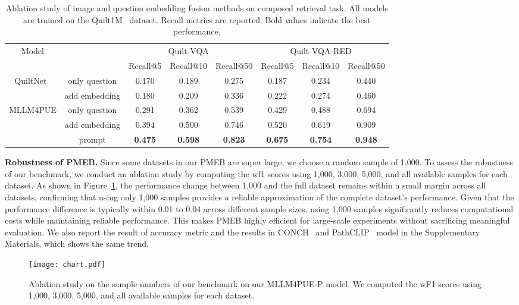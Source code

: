 \begin{table*}[h!]
\small
\centering
\begin{tabular}{cccccccc}
\hline
\multirow{2}{*}{Model}& & \multicolumn{3}{c}{Quilt-VQA~\cite{gamper2021multiple}} & \multicolumn{3}{c}{Quilt-VQA-RED~\cite{gamper2021multiple}} \\ 
&& Recall@5 &Recall@10 & Recall@50 & Recall@5 & Recall@10 & Recall@50\\
\hline
\multirow{2}{*}{QuiltNet~\cite{ikezogwo2024quilt}}& only question & 0.170 & 0.189 & 0.275 & 0.187 & 0.234 & 0.440\\ 
& add embedding & 0.180 & 0.209 & 0.336 & 0.222 & 0.274 & 0.460\\ 
\hline
\multirow{3}{*}{MLLM4PUE}&only question & 0.291 & 0.362 & 0.539 & 0.429 & 0.488 & 0.694\\ 
& add embedding& 0.394 & 0.500 & 0.746 & 0.520 & 0.619 & 0.909\\ 
&prompt & \textbf{0.475} & \textbf{0.598} & \textbf{0.823} & \textbf{0.675} & \textbf{0.754} & \textbf{0.948}\\
\hline
\end{tabular}
\caption{Ablation study of image and question embedding fusion methods on composed retrieval task. All models are trained on the Quilt1M~\cite{ikezogwo2024quilt} dataset. Recall metrics are reported. Bold values indicate the best performance.}
\label{t6}
\vspace{-2ex}
\end{table*}
\textbf{Robustness of PMEB.} Since some datasets in our PMEB are super large, we choose a random sample of 1,000. To assess the robustness of our benchmark, we conduct an ablation study by computing the wf1 scores using 1,000, 3,000, 5,000, and all available samples for each dataset. As shown in Figure~\ref{fig5}, the performance change between 1,000 and the full dataset remains within a small margin across all datasets, confirming that using only 1,000 samples provides a reliable approximation of the complete dataset's performance. Given that the performance difference is typically within 0.01 to 0.04 across different sample sizes, using 1,000 samples significantly reduces computational costs while maintaining reliable performance. This makes PMEB highly efficient for large-scale experiments without sacrificing meaningful evaluation. We also report the result of accuracy metric and the results in CONCH~\cite{lu2024visual} and PathCLIP~\cite{sun2024pathasst} model in the Supplementary Materials, which shows the same trend.
\begin{figure}[!h]
  \centering
\texttt{[image: chart.pdf]}
\vspace{-4ex}
   \caption{Ablation study on the sample numbers of our benchmark on our MLLM4PUE-P model. We computed the wF1 scores using 1,000, 3,000, 5,000, and all available samples for each dataset.}
   \label{fig5}
   \vspace{-2ex}
\end{figure}

